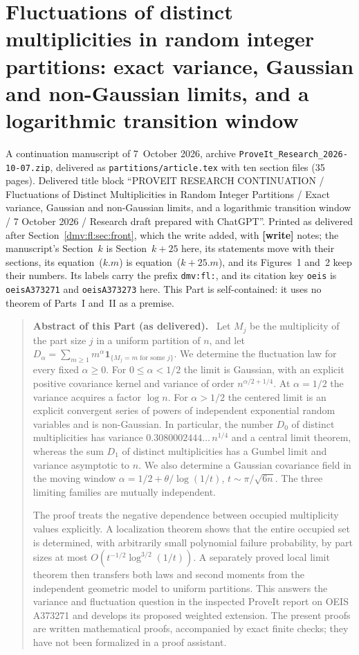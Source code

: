 \documentclass[11pt,letterpaper]{article}
\numberwithin{equation}{section}
\theoremstyle{definition}\newtheorem{definition}[theorem]{Definition}
\theoremstyle{remark}\newtheorem{remark}[theorem]{Remark}
\newcommand{\file}[1]{\nolinkurl{#1}}
\newenvironment{partabstract}{\begin{quote}\small\noindent\textbf{Abstract of this Part (as delivered).}\ }{\end{quote}}
\newcommand{\partsource}[1]{\par\noindent\begin{minipage}{\textwidth}\small #1\end{minipage}\par\medskip}
\newcommand{\ind}{\mathbf 1}
\begin{document}
\part{Fluctuations of distinct multiplicities in random integer partitions: exact variance, Gaussian and non-Gaussian limits, and a logarithmic transition window}\label{dmv:fl:part}
\partsource{A continuation manuscript of 7~October 2026, archive \file{ProveIt_Research_2026-10-07.zip}, delivered as \file{partitions/article.tex} with ten section files (35 pages). Delivered title block ``PROVEIT RESEARCH CONTINUATION / Fluctuations of Distinct Multiplicities in Random Integer Partitions / Exact variance, Gaussian and non-Gaussian limits, and a logarithmic transition window / 7 October 2026 / Research draft prepared with ChatGPT''. Printed as delivered after Section~\ref{dmv:fl:sec:front}, which the write added, with \textbf{[write]} notes; the manuscript's Section~$k$ is Section~$k+25$ here, its statements move with their sections, its equation~($k.m$) is equation~($k{+}25.m$), and its Figures~1 and~2 keep their numbers. Its labels carry the prefix \file{dmv:fl:}, and its citation key \file{oeis} is \file{oeisA373271} and \file{oeisA373273} here. This Part is self-contained: it uses no theorem of Parts~I and~II as a premise.}
\begin{partabstract}
Let $M_j$ be the multiplicity of the part size $j$ in a uniform partition
of $n$, and let $D_\alpha=\sum_{m\ge1}m^\alpha
\ind_{\{M_j=m\text{ for some }j\}}$. We determine the fluctuation law
for every fixed $\alpha\ge0$. For $0\le\alpha<1/2$ the limit is Gaussian,
with an explicit positive covariance kernel and variance of order
$n^{\alpha/2+1/4}$. At $\alpha=1/2$ the variance acquires a factor
$\log n$. For $\alpha>1/2$ the centered limit is an explicit convergent
series of powers of independent exponential random variables and is
non-Gaussian. In particular, the number $D_0$ of distinct multiplicities
has variance $0.3080002444\ldots\,n^{1/4}$ and a central limit theorem,
whereas the sum $D_1$ of distinct multiplicities has a Gumbel limit and
variance asymptotic to $n$. We also determine a Gaussian covariance field
in the moving window $\alpha=1/2+\theta/\log(1/t)$,
$t\sim\pi/\sqrt{6n}$. The three limiting families are mutually independent.

The proof treats the negative dependence between occupied multiplicity
values explicitly. A localization theorem shows that the entire occupied
set is determined, with arbitrarily small polynomial failure probability,
by part sizes at most $O(t^{-1/2}\log^{3/2}(1/t))$. A separately proved
local limit theorem then transfers both laws and second moments from the
independent geometric model to uniform partitions. This answers the
variance and fluctuation question in the inspected ProveIt report on
OEIS A373271 and develops its proposed weighted extension. The present
proofs are written mathematical proofs, accompanied by exact finite
checks; they have not been formalized in a proof assistant.
\end{partabstract}
\end{document}
